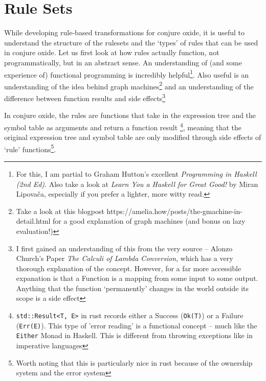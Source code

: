 \section{Rule Sets}

While developing rule-based transformations for conjure oxide, it is useful to understand the structure of the rulesets and the `types' of rules that can be used in conjure oxide. Let us first look at how rules actually function, not programmatically, but in an abstract sense. An understanding of (and some experience of) functional programming is incredibly helpful\footnote{For this, I am partial to Graham Hutton's excellent \emph{Programming in Haskell (2nd Ed)}. Also take a look at \emph{Learn You a Haskell for Great Good!} by Miran Lipovača, especially if you prefer a lighter, more witty read.}. Also useful is an understanding of the idea behind graph machines\footnote{Take a look at this blogpost https://amelia.how/posts/the-gmachine-in-detail.html for a good explanation of graph machines (and bonus on lazy evaluation!)} and an understanding of the difference between function results and side effects\footnote{I first gained an understanding of this from the very source -- Alonzo Church's Paper \emph{The Calculi of Lambda Conversion}, which has a very thorough explanation of the concept. However, for a far more accessible expanation is that a Function is a mapping from some input to some output. Anything that the function `permanently' changes in the world outside its scope is a side effect}

In conjure oxide, the rules are functions that take in the expression tree and the symbol table as arguments and return a function result \footnote{\texttt{std::Result<T, E>} in rust records either a Success (\texttt{Ok(T)}) or a Failure (\texttt{Err(E)}). This type of 'error reading' is a functional concept -- much like the \texttt{Either} Monad in Haskell. This is different from throwing exceptions like in imperative languages}, meaning that the original expression tree and symbol table are only modified through side effects of `rule' functions\footnote{Worth noting that this is particularly nice in rust because of the ownership system and the error system}.

